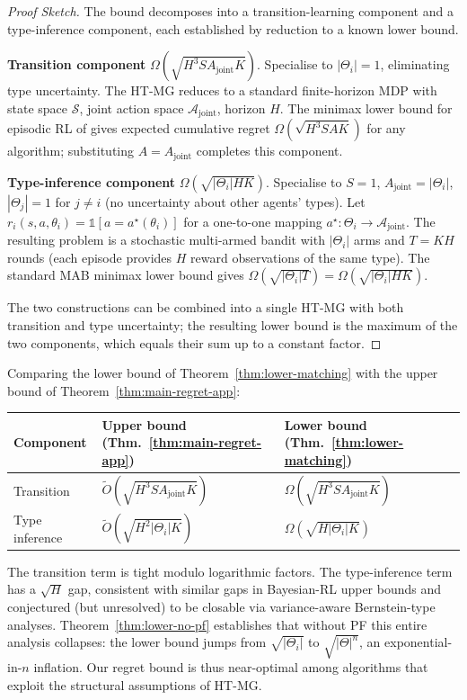 \begin{proof}[Proof Sketch]
The bound decomposes into a transition-learning component and a type-inference component, each established by reduction to a known lower bound.

\textbf{Transition component} $\Omega(\sqrt{H^3 S A_{\mathrm{joint}} K})$. Specialise to $|\Theta_i| = 1$, eliminating type uncertainty. The HT-MG reduces to a standard finite-horizon MDP with state space $\mathcal{S}$, joint action space $\mathcal{A}_{\mathrm{joint}}$, horizon $H$. The minimax lower bound for episodic RL of \citet[Theorem 1]{domingues2021episodic} gives expected cumulative regret $\Omega(\sqrt{H^3 S A K})$ for any algorithm; substituting $A = A_{\mathrm{joint}}$ completes this component.

\textbf{Type-inference component} $\Omega(\sqrt{|\Theta_i| H K})$. Specialise to $S = 1$, $A_{\mathrm{joint}} = |\Theta_i|$, $|\Theta_j| = 1$ for $j \neq i$ (no uncertainty about other agents' types). Let $r_i(s, a, \theta_i) = \mathbb{1}[a = a^\star(\theta_i)]$ for a one-to-one mapping $a^\star \colon \Theta_i \to \mathcal{A}_{\mathrm{joint}}$. The resulting problem is a stochastic multi-armed bandit with $|\Theta_i|$ arms and $T = KH$ rounds (each episode provides $H$ reward observations of the same type). The standard MAB minimax lower bound \citep[Theorem 15.2]{lattimore2020bandit} gives $\Omega(\sqrt{|\Theta_i| T}) = \Omega(\sqrt{|\Theta_i| HK})$.

The two constructions can be combined into a single HT-MG with both transition and type uncertainty; the resulting lower bound is the maximum of the two components, which equals their sum up to a constant factor.
\end{proof}

Comparing the lower bound of Theorem~\ref{thm:lower-matching} with the upper bound of Theorem~\ref{thm:main-regret-app}:
\begin{center}
\small
\begin{tabular}{lll}
\toprule
Component & Upper bound (Thm.~\ref{thm:main-regret-app}) & Lower bound (Thm.~\ref{thm:lower-matching}) \\
\midrule
Transition & $\tilde O(\sqrt{H^3 S A_{\mathrm{joint}} K})$ & $\Omega(\sqrt{H^3 S A_{\mathrm{joint}} K})$ \\
Type inference & $\tilde O(\sqrt{H^2 |\Theta_i| K})$ & $\Omega(\sqrt{H |\Theta_i| K})$ \\
\bottomrule
\end{tabular}
\end{center}
The transition term is tight modulo logarithmic factors. The type-inference term has a $\sqrt{H}$ gap, consistent with similar gaps in Bayesian-RL upper bounds and conjectured (but unresolved) to be closable via variance-aware Bernstein-type analyses. Theorem~\ref{thm:lower-no-pf} establishes that without PF this entire analysis collapses: the lower bound jumps from $\sqrt{|\Theta_i|}$ to $\sqrt{|\Theta|^n}$, an exponential-in-$n$ inflation. Our regret bound is thus near-optimal among algorithms that exploit the structural assumptions of HT-MG.



